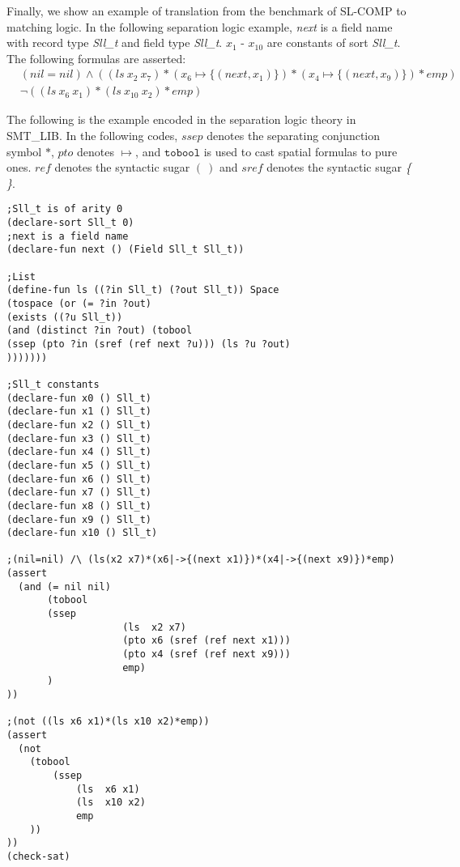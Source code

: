 \documentclass{article}
\theoremstyle{plain}
\begin{document}
Finally, we show an example of translation from the benchmark of SL-COMP to matching logic. In the following separation logic example, \textit{next} is a field name with record type \textit{Sll\_t} and field type \textit{Sll\_t}. $x_1$ - $x_{10}$ are constants of sort \textit{Sll\_t}. The following formulas are asserted:
\begin{equation*}
\begin{split}
&(\mathit{nil} = \mathit{nil}) \wedge ((\mathit{ls}\ x_2\ x_7) * (x_6 \mapsto \{(\mathit{next},x_1)\}) * (x_4 \mapsto \{(\mathit{next},x_9)\}) *\mathit{emp}) \\  &\neg((\mathit{ls}\ x_6\ x_1) *(\mathit{ls}\ x_{10}\ x_2) *\mathit{emp})
\end{split}
\end{equation*}

The following is the example encoded in the separation logic theory in SMT\_LIB. In the following codes, $ssep$ denotes the separating conjunction symbol $*$, $pto$ denotes $\mapsto$, and $\mathtt{tobool}$ is used to cast spatial formulas to pure ones. $ref$ denotes the syntactic sugar $\mathit{(\ )}$ and $sref$ denotes the syntactic sugar \textit{\{ \}}.
\begin{verbatim}
;Sll_t is of arity 0
(declare-sort Sll_t 0)
;next is a field name
(declare-fun next () (Field Sll_t Sll_t))

;List
(define-fun ls ((?in Sll_t) (?out Sll_t)) Space
(tospace (or (= ?in ?out)
(exists ((?u Sll_t))
(and (distinct ?in ?out) (tobool
(ssep (pto ?in (sref (ref next ?u))) (ls ?u ?out)
)))))))

;Sll_t constants
(declare-fun x0 () Sll_t)
(declare-fun x1 () Sll_t)
(declare-fun x2 () Sll_t)
(declare-fun x3 () Sll_t)
(declare-fun x4 () Sll_t)
(declare-fun x5 () Sll_t)
(declare-fun x6 () Sll_t)
(declare-fun x7 () Sll_t)
(declare-fun x8 () Sll_t)
(declare-fun x9 () Sll_t)
(declare-fun x10 () Sll_t)

;(nil=nil) /\ (ls(x2 x7)*(x6|->{(next x1)})*(x4|->{(next x9)})*emp) 
(assert
  (and (= nil nil)
       (tobool 
       (ssep
		            (ls  x2 x7) 
		            (pto x6 (sref (ref next x1))) 
		            (pto x4 (sref (ref next x9))) 
		            emp)
	   )  
))

;(not ((ls x6 x1)*(ls x10 x2)*emp))
(assert
  (not
    (tobool 
	    (ssep
       		(ls  x6 x1) 
       		(ls  x10 x2) 
       		emp
	))
))
(check-sat)

\end{verbatim}
\end{document}
